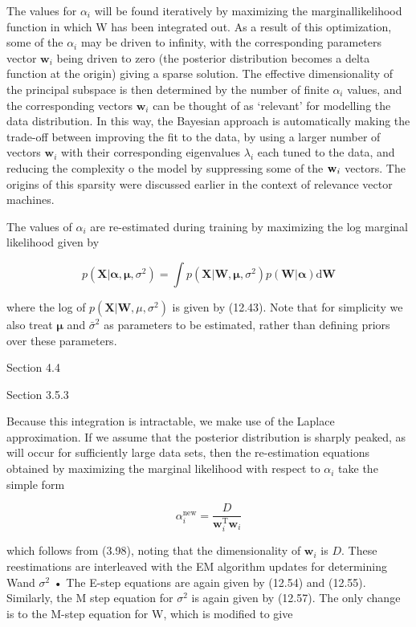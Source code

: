 \documentclass[
  10
]{article}
\begin{document}
The values for \(\alpha _ { i }\) will be found iteratively by
maximizing the marginallikelihood function in which W has been
integrated out. As a result of this optimization, some of the
\(\alpha _ { i }\) may be driven to infinity, with the corresponding
parameters vector \(\mathbf { w } _ { i }\) being driven to zero (the
posterior distribution becomes a delta function at the origin) giving a
sparse solution. The effective dimensionality of the principal subspace
is then determined by the number of finite \(\alpha _ { i }\) values,
and the corresponding vectors \(\mathbf { w } _ { i }\) can be thought
of as `relevant' for modelling the data distribution. In this way, the
Bayesian approach is automatically making the trade-off between
improving the fit to the data, by using a larger number of vectors
\(\mathbf { w } _ { i }\) with their corresponding eigenvalues
\(\lambda _ { i }\) each tuned to the data, and reducing the complexity
o the model by suppressing some of the \({ \bf w } _ { i }\) vectors.
The origins of this sparsity were discussed earlier in the context of
relevance vector machines.

The values of \(\alpha _ { i }\) are re-estimated during training by
maximizing the log marginal likelihood given by

\[
p (\mathbf {X} | \boldsymbol {\alpha}, \boldsymbol {\mu}, \sigma^ {2}) = \int p (\mathbf {X} | \mathbf {W}, \boldsymbol {\mu}, \sigma^ {2}) p (\mathbf {W} | \boldsymbol {\alpha}) \mathrm{d} \mathbf {W}\tag{12.61}
\]

where the log of
\(p ( \mathbf { X } | \mathbf { W } , \mu , \sigma ^ { 2 } )\) is given
by (12.43). Note that for simplicity we also treat \(\pmb { \mu }\) and
\(\bar { \sigma } ^ { 2 }\) as parameters to be estimated, rather than
defining priors over these parameters.

Section 4.4

Section 3.5.3

Because this integration is intractable, we make use of the Laplace
approximation. If we assume that the posterior distribution is sharply
peaked, as will occur for sufficiently large data sets, then the
re-estimation equations obtained by maximizing the marginal likelihood
with respect to \(\alpha _ { i }\) take the simple form

\[
\alpha_ {i} ^ {\mathrm{new}} = \frac {D}{\mathbf {w} _ {i} ^ {\mathrm{T}} \mathbf {w} _ {i}}\tag{12.62}
\]

which follows from (3.98), noting that the dimensionality of
\(\mathbf { w } _ { i }\) is \(D .\) These reestimations are interleaved
with the EM algorithm updates for determining Wand \(\sigma ^ { 2 }\) •
The E-step equations are again given by (12.54) and (12.55). Similarly,
the M step equation for \(\sigma ^ { 2 }\) is again given by (12.57).
The only change is to the M-step equation for W, which is modified to
give
\end{document}
